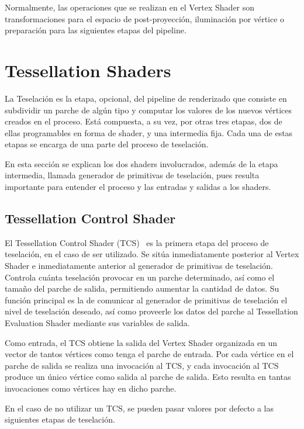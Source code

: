 Normalmente, las operaciones que se realizan en el Vertex Shader son
transformaciones para el espacio de post-proyección, iluminación por vértice o
preparación para las siguientes etapas del pipeline. 

\section{Tessellation Shaders}
\label{ref:TesShaders}

La Teselación es la etapa, opcional, del pipeline de renderizado que consiste en
subdividir un parche de algún tipo y computar los valores de los nuevos vértices
creados en el proceso. Está compuesta, a su vez, por otras tres etapas, dos de
ellas programables en forma de shader, y una intermedia fija. Cada una de estas
etapas se encarga de una parte del proceso de teselación.

En esta sección se explican los dos shaders involucrados, además de la etapa
intermedia, llamada generador de primitivas de teselación, pues resulta
importante para entender el proceso y las entradas y salidas a los shaders.

\subsection{Tessellation Control Shader}
\label{ref:TesConShader}

El Tessellation Control Shader (TCS)~\cite{TesConShader} es la primera etapa del
proceso de teselación, en el caso de ser utilizado. Se sitúa inmediatamente
posterior al Vertex Shader e inmediatamente anterior al generador de primitivas
de teselación. Controla cuánta teselación provocar en un parche determinado, así
como el tamaño del parche de salida, permitiendo aumentar la cantidad de datos.
Su función principal es la de comunicar al generador de primitivas de teselación
el nivel de teselación deseado, así como proveerle los datos del parche al
Tessellation Evaluation Shader mediante sus variables de salida.

Como entrada, el TCS obtiene la salida del Vertex Shader organizada en un vector
de tantos vértices como tenga el parche de entrada. Por cada vértice en el
parche de salida se realiza una invocación al TCS, y cada invocación al TCS
produce un único vértice como salida al parche de salida. Esto resulta en tantas
invocaciones como vértices hay en dicho parche.

En el caso de no utilizar un TCS, se pueden pasar valores por defecto a las
siguientes etapas de teselación.


